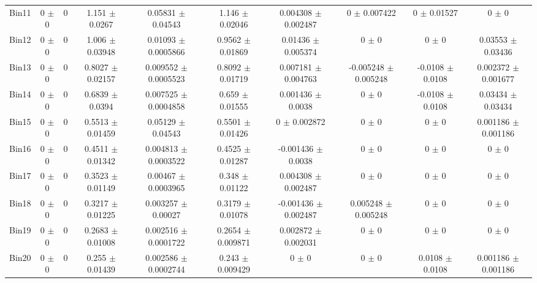 \begin{tabular}{@{\extracolsep{4pt}}lccccccccc@{}}
     Bin11 & 0 $\pm$ 0 & 0 & 1.151 $\pm$ 0.0267 & 0.05831 $\pm$ 0.04543 & 1.146 $\pm$ 0.02046 & 0.004308 $\pm$ 0.002487 & 0 $\pm$ 0.007422 & 0 $\pm$ 0.01527 & 0 $\pm$ 0 \\ 
     Bin12 & 0 $\pm$ 0 & 0 & 1.006 $\pm$ 0.03948 & 0.01093 $\pm$ 0.0005866 & 0.9562 $\pm$ 0.01869 & 0.01436 $\pm$ 0.005374 & 0 $\pm$ 0 & 0 $\pm$ 0 & 0.03553 $\pm$ 0.03436 \\ 
     Bin13 & 0 $\pm$ 0 & 0 & 0.8027 $\pm$ 0.02157 & 0.009552 $\pm$ 0.0005523 & 0.8092 $\pm$ 0.01719 & 0.007181 $\pm$ 0.004763 & -0.005248 $\pm$ 0.005248 & -0.0108 $\pm$ 0.0108 & 0.002372 $\pm$ 0.001677 \\ 
     Bin14 & 0 $\pm$ 0 & 0 & 0.6839 $\pm$ 0.0394 & 0.007525 $\pm$ 0.0004858 & 0.659 $\pm$ 0.01555 & 0.001436 $\pm$ 0.0038 & 0 $\pm$ 0 & -0.0108 $\pm$ 0.0108 & 0.03434 $\pm$ 0.03434 \\ 
     Bin15 & 0 $\pm$ 0 & 0 & 0.5513 $\pm$ 0.01459 & 0.05129 $\pm$ 0.04543 & 0.5501 $\pm$ 0.01426 & 0 $\pm$ 0.002872 & 0 $\pm$ 0 & 0 $\pm$ 0 & 0.001186 $\pm$ 0.001186 \\ 
     Bin16 & 0 $\pm$ 0 & 0 & 0.4511 $\pm$ 0.01342 & 0.004813 $\pm$ 0.0003522 & 0.4525 $\pm$ 0.01287 & -0.001436 $\pm$ 0.0038 & 0 $\pm$ 0 & 0 $\pm$ 0 & 0 $\pm$ 0 \\ 
     Bin17 & 0 $\pm$ 0 & 0 & 0.3523 $\pm$ 0.01149 & 0.00467 $\pm$ 0.0003965 & 0.348 $\pm$ 0.01122 & 0.004308 $\pm$ 0.002487 & 0 $\pm$ 0 & 0 $\pm$ 0 & 0 $\pm$ 0 \\ 
     Bin18 & 0 $\pm$ 0 & 0 & 0.3217 $\pm$ 0.01225 & 0.003257 $\pm$ 0.00027 & 0.3179 $\pm$ 0.01078 & -0.001436 $\pm$ 0.002487 & 0.005248 $\pm$ 0.005248 & 0 $\pm$ 0 & 0 $\pm$ 0 \\ 
     Bin19 & 0 $\pm$ 0 & 0 & 0.2683 $\pm$ 0.01008 & 0.002516 $\pm$ 0.0001722 & 0.2654 $\pm$ 0.009871 & 0.002872 $\pm$ 0.002031 & 0 $\pm$ 0 & 0 $\pm$ 0 & 0 $\pm$ 0 \\ 
     Bin20 & 0 $\pm$ 0 & 0 & 0.255 $\pm$ 0.01439 & 0.002586 $\pm$ 0.0002744 & 0.243 $\pm$ 0.009429 & 0 $\pm$ 0 & 0 $\pm$ 0 & 0.0108 $\pm$ 0.0108 & 0.001186 $\pm$ 0.001186 \\ 
\hline\hline
  \end{tabular}
